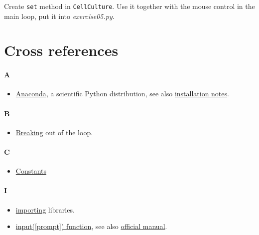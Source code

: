 \documentclass[
]{book}
\providecommand{\tightlist}{%
  \setlength{\itemsep}{0pt}\setlength{\parskip}{0pt}}
\begin{document}
Create \texttt{set} method in \texttt{CellCulture}. Use it together with the mouse control in the main loop, put it into \emph{exercise05.py}.

\hypertarget{cross-references}{%
\chapter*{Cross references}\label{cross-references}}

\hypertarget{a}{%
\subsubsection*{A}\label{a}}

\begin{itemize}
\tightlist
\item
  \href{https://www.anaconda.com}{Anaconda}, a scientific Python distribution, see also \protect\hyperlink{install-anaconda}{installation notes}.
\end{itemize}

\hypertarget{b}{%
\subsubsection*{B}\label{b}}

\begin{itemize}
\tightlist
\item
  \protect\hyperlink{break}{Breaking} out of the loop.
\end{itemize}

\hypertarget{c}{%
\subsubsection*{C}\label{c}}

\begin{itemize}
\tightlist
\item
  \protect\hyperlink{constants}{Constants}
\end{itemize}

\hypertarget{i}{%
\subsubsection*{I}\label{i}}

\begin{itemize}
\tightlist
\item
  \protect\hyperlink{import}{importing} libraries.
\item
  \protect\hyperlink{input-function}{input({[}prompt{]}) function}, see also \href{https://docs.python.org/3/library/functions.html\#input}{official manual}.
\end{itemize}
\end{document}
